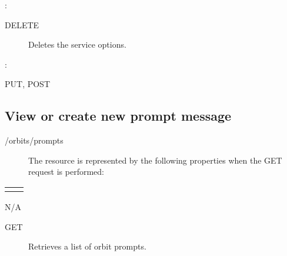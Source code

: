 \documentclass[letterpaper,10pt,english]{sphinxmanual}
\begin{document}
:

\begin{sphinxVerbatim}[commandchars=\\\{\}]
\end{sphinxVerbatim}
\begin{description}
\item[{ DELETE}] \leavevmode
Deletes the service options.

\end{description}

:

\begin{sphinxVerbatim}[commandchars=\\\{\}]
\end{sphinxVerbatim}

 PUT, POST


\subsection{View or create new prompt message}
\label{\detokenize{restapi:id2}}
 /orbits/prompts
\begin{description}
\item[{}] \leavevmode
The resource is represented by the following properties when the GET request is performed:

\end{description}


\begin{savenotes}\sphinxattablestart
\centering
\begin{tabulary}{\linewidth}[t]{|T|T|}
\hline

&
\\
\hline&\\
\hline
\end{tabulary}
\par
\sphinxattableend\end{savenotes}

 N/A
\begin{description}
\item[{ GET}] \leavevmode
Retrieves a list of orbit prompts.

\end{description}
\end{document}
